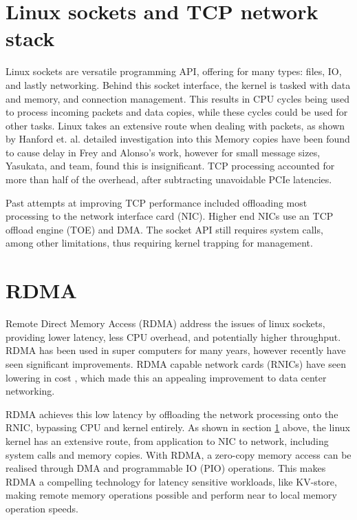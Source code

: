 \section[Linux scokets and TCP]{Linux sockets and TCP network stack}\label{sec:linux-sockets}
Linux sockets are versatile programming API, offering for many types: files, IO, and lastly networking.
Behind this socket interface, the kernel is tasked with data and memory, and connection management\cite{hanford2018survey, seth2009tcp}.
This results in CPU cycles being used to process incoming packets and data copies, while these cycles could be used for other tasks.
Linux takes an extensive route when dealing with packets, as shown by Hanford et. al. detailed investigation into this\cite{hanford2018survey}
Memory copies have been found to cause delay in Frey and Alonso's work\cite{frey2009minimizing}, however for small message sizes, Yasukata, and team, found this is insignificant\cite{yasukata2016stackmap}.
TCP processing accounted for more than half of the overhead, after subtracting unavoidable PCIe latencies.

Past attempts at improving TCP performance included offloading most processing to the network interface card (NIC)\cite{hanford2018survey}.
Higher end NICs use an TCP offload engine (TOE) and DMA.
The socket API still requires system calls, among other limitations, thus requiring kernel trapping for management.

\section[RDMA]{RDMA}\label{sec:rdma}
Remote Direct Memory Access (RDMA) address the issues of linux sockets, providing lower latency, less CPU overhead, and potentially higher throughput.
RDMA has been used in super computers for many years, however recently have seen significant improvements.
RDMA capable network cards (RNICs) have seen lowering in cost \cite{kalia2016design}, which made this an appealing improvement to data center networking.

RDMA achieves this low latency by offloading the network processing onto the RNIC, bypassing CPU and kernel entirely.
As shown in section \ref{sec:linux-sockets} above, the linux kernel has an extensive route, from application to NIC to network, including system calls and memory copies.
With RDMA, a zero-copy memory access can be realised through DMA and programmable IO (PIO) operations.
This makes RDMA a compelling technology for latency sensitive workloads, like KV-store, making remote memory operations possible and perform near to local memory operation speeds.


